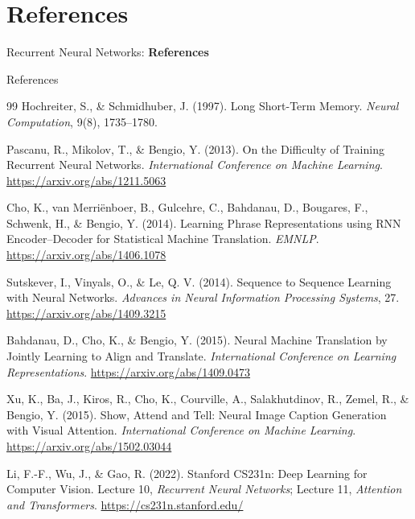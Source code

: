 \section{References}
\begin{frame}{}
    \LARGE Recurrent Neural Networks: \textbf{References}
\end{frame}

\begin{frame}[allowframebreaks]{References}
    \begin{thebibliography}{99}
        Hochreiter, S., \& Schmidhuber, J. (1997).
        Long Short-Term Memory.
        \emph{Neural Computation}, 9(8), 1735--1780.

        Pascanu, R., Mikolov, T., \& Bengio, Y. (2013).
        On the Difficulty of Training Recurrent Neural Networks.
        \emph{International Conference on Machine Learning}.
        \url{https://arxiv.org/abs/1211.5063}

        Cho, K., van Merri\"enboer, B., Gulcehre, C., Bahdanau, D., Bougares, F., Schwenk, H., \& Bengio, Y. (2014).
        Learning Phrase Representations using RNN Encoder--Decoder for Statistical Machine Translation.
        \emph{EMNLP}.
        \url{https://arxiv.org/abs/1406.1078}

        Sutskever, I., Vinyals, O., \& Le, Q. V. (2014).
        Sequence to Sequence Learning with Neural Networks.
        \emph{Advances in Neural Information Processing Systems}, 27.
        \url{https://arxiv.org/abs/1409.3215}

        Bahdanau, D., Cho, K., \& Bengio, Y. (2015).
        Neural Machine Translation by Jointly Learning to Align and Translate.
        \emph{International Conference on Learning Representations}.
        \url{https://arxiv.org/abs/1409.0473}

        Xu, K., Ba, J., Kiros, R., Cho, K., Courville, A., Salakhutdinov, R., Zemel, R., \& Bengio, Y. (2015).
        Show, Attend and Tell: Neural Image Caption Generation with Visual Attention.
        \emph{International Conference on Machine Learning}.
        \url{https://arxiv.org/abs/1502.03044}

        Li, F.-F., Wu, J., \& Gao, R. (2022).
        Stanford CS231n: Deep Learning for Computer Vision.
        Lecture 10, \emph{Recurrent Neural Networks}; Lecture 11, \emph{Attention and Transformers}.
        \url{https://cs231n.stanford.edu/}
    \end{thebibliography}
\end{frame}
